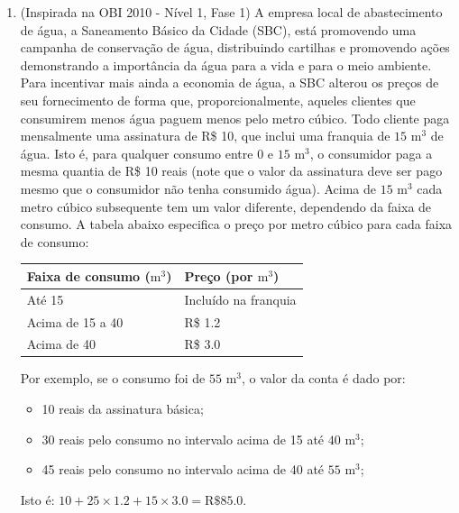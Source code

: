 \begin{enumerate}[label=\textbf{Q\arabic*.}]
    Escreva uma função em Python que calcule a pontuação final de um jogador neste jogo. A função recebe 4 argumentos inteiros, nesta ordem: a quantidade de bolas vermelhas encontradas pelo jogador, a quantidade total de bolas vermelhas totais estavam no cesto, o tempo limite da tarefa (em minutos), e o tempo em que o jogador concluiu a tarefa (em minutos). A função deve retornar um número que representa a pontuação final do jogador.
    

    \vspace{0.5cm}

    \item (Inspirada na OBI 2010 - Nível 1, Fase 1) A empresa local de abastecimento de água, a Saneamento Básico da Cidade (SBC), está promovendo uma campanha de conservação de água, distribuindo cartilhas e promovendo ações demonstrando a importância da água para a vida e para o meio ambiente. Para incentivar mais ainda a economia de água, a SBC alterou os preços de seu fornecimento de forma que, proporcionalmente, aqueles clientes que consumirem menos água paguem menos pelo metro cúbico. Todo cliente paga mensalmente uma assinatura de R\$ 10, que inclui uma franquia de $15\text{ m}^3$ de água. Isto é, para qualquer consumo entre 0 e $15\text{ m}^3$, o consumidor paga a mesma quantia de R\$ 10 reais (note que o valor da assinatura deve ser pago mesmo que o consumidor não tenha consumido água). Acima de $15\text{ m}^3$ cada metro cúbico subsequente tem um valor diferente, dependendo da faixa de consumo. A tabela abaixo especifica o preço por metro cúbico para cada faixa de consumo:

    \begin{center}
    \begin{tabular}{|l|l|}
        \hline
        \textbf{Faixa de consumo ($\text{m}^3$)} & \textbf{Preço (por $\text{m}^3$)} \\ \hline
        Até 15 & Incluído na franquia \\ \hline
        Acima de 15 a 40 & R\$ 1.2 \\ \hline
        Acima de 40 & R\$ 3.0 \\ \hline
    \end{tabular}
    \end{center}

    Por exemplo, se o consumo foi de $55\text{ m}^3$, o valor da conta é dado por:
    \begin{itemize}
        \item 10 reais da assinatura básica;
        \item 30 reais pelo consumo no intervalo acima de 15 até $40\text{ m}^3$;
        \item 45 reais pelo consumo no intervalo acima de 40 até $55\text{ m}^3$;
    \end{itemize}
    Isto é: $10 + 25 \times 1.2 + 15 \times 3.0 = \text{R}\$ 85.0$.


\end{enumerate}
